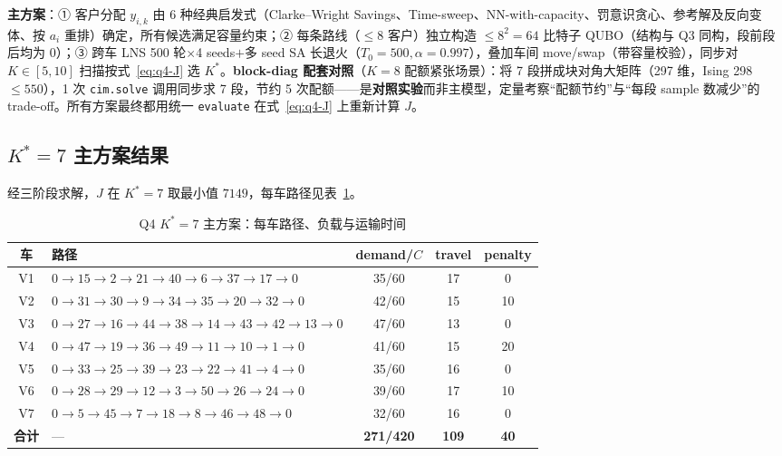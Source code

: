 \documentclass[UTF8,12pt,a4paper]{ctexart}
\begin{document}
\textbf{主方案}：① 客户分配 $y_{i,k}$ 由 6 种经典启发式（Clarke--Wright Savings\cite{clarke1964savings}、Time-sweep、NN-with-capacity、罚意识贪心、参考解及反向变体、按 $a_i$ 重排）确定，所有候选满足容量约束；② 每条路线（$\le 8$ 客户）独立构造 $\le 8^{2}=64$ 比特子 QUBO（结构与 Q3 同构，段前段后均为 0）；③ 跨车 LNS 500 轮$\times$4 seeds$+$多 seed SA 长退火（$T_0=500,\alpha=0.997$），叠加车间 move/swap（带容量校验），同步对 $K\!\in\![5,10]$ 扫描按式~\eqref{eq:q4-J} 选 $K^*$。\textbf{block-diag 配套对照}（$K=8$ 配额紧张场景）：将 7 段拼成块对角大矩阵（297 维，Ising 298 $\le 550$），1 次 \texttt{cim.solve} 调用同步求 7 段，节约 5 次配额——是\textbf{对照实验}而非主模型，定量考察``配额节约''与``每段 sample 数减少''的 trade-off。所有方案最终都用统一 \texttt{evaluate} 在式~\eqref{eq:q4-J} 上重新计算 $J$。

\subsection{$K^{*}=7$ 主方案结果}
\label{subsec:q4-k7}

经三阶段求解，$J$ 在 $K^{*}=7$ 取最小值 $7149$，每车路径见表~\ref{tab:q4-k7-routes}。

\begin{table}[H]
    \centering\footnotesize
    \caption{Q4 $K^{*}=7$ 主方案：每车路径、负载与运输时间}
    \label{tab:q4-k7-routes}
    \begin{tabular}{cl ccc}
        \toprule
        车 & 路径 & demand/$C$ & travel & penalty \\
        \midrule
        V1 & $0\!\to\!15\!\to\!2\!\to\!21\!\to\!40\!\to\!6\!\to\!37\!\to\!17\!\to\!0$ & 35/60 & 17 & 0 \\
        V2 & $0\!\to\!31\!\to\!30\!\to\!9\!\to\!34\!\to\!35\!\to\!20\!\to\!32\!\to\!0$ & 42/60 & 15 & 10 \\
        V3 & $0\!\to\!27\!\to\!16\!\to\!44\!\to\!38\!\to\!14\!\to\!43\!\to\!42\!\to\!13\!\to\!0$ & 47/60 & 13 & 0 \\
        V4 & $0\!\to\!47\!\to\!19\!\to\!36\!\to\!49\!\to\!11\!\to\!10\!\to\!1\!\to\!0$ & 41/60 & 15 & 20 \\
        V5 & $0\!\to\!33\!\to\!25\!\to\!39\!\to\!23\!\to\!22\!\to\!41\!\to\!4\!\to\!0$ & 35/60 & 16 & 0 \\
        V6 & $0\!\to\!28\!\to\!29\!\to\!12\!\to\!3\!\to\!50\!\to\!26\!\to\!24\!\to\!0$ & 39/60 & 17 & 10 \\
        V7 & $0\!\to\!5\!\to\!45\!\to\!7\!\to\!18\!\to\!8\!\to\!46\!\to\!48\!\to\!0$ & 32/60 & 16 & 0 \\
        \midrule
        \textbf{合计} & --- & \textbf{271/420} & \textbf{109} & \textbf{40} \\
        \bottomrule
    \end{tabular}
\end{table}
\end{document}
